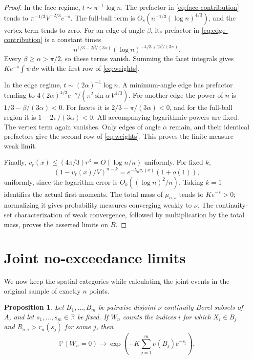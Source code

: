 \documentclass[11pt]{article}
\newtheorem{proposition}[theorem]{Proposition}
\newcommand{\PP}{\mathbb P}
\begin{document}
\begin{proof}
In the face regime, $t\sim\pi^{-1}\log n$. The prefactor in
\eqref{eq:face-contribution} tends to $\pi^{-1/3}V^{-2/3}e^{-s}$.
The full-ball term is $O_s(n^{-1/3}(\log n)^{4/3})$, and the vertex term
tends to zero. For an edge of angle $\beta$, its prefactor in
\eqref{eq:edge-contribution} is a constant times
\[
 n^{1/3-2\beta/(3\pi)}(\log n)^{-4/3+2\beta/(3\pi)}.
\]
Every $\beta\geq\alpha>\pi/2$, so these terms vanish. Summing the facet
integrals gives $Ke^{-s}\int\psi\,d\nu$ with the first row of
\eqref{eq:weights}.

In the edge regime, $t\sim(2\alpha)^{-1}\log n$. A minimum-angle edge
has prefactor tending to
$4(2\alpha)^{4/3}e^{-s}/(\pi^2\sin\alpha\,V^{1/3})$.
For another edge the power of $n$ is $1/3-\beta/(3\alpha)<0$.
For facets it is $2/3-\pi/(3\alpha)<0$, and for the full-ball region it
is $1-2\pi/(3\alpha)<0$. All accompanying logarithmic powers are fixed.
The vertex term again vanishes. Only edges of angle $\alpha$ remain,
and their identical prefactors give the second row of \eqref{eq:weights}.
This proves the finite-measure weak limit.

Finally, $v_r(x)\leq(4\pi/3)r^3=O(\log n/n)$ uniformly. For fixed $k$,
\begin{equation}\label{eq:binomial-approximation}
 (1-v_r(x)/V)^{n-k}
 =e^{-\lambda_nv_r(x)}(1+o(1)),
\end{equation}
uniformly, since the logarithm error is $O_k((\log n)^2/n)$.
Taking $k=1$ identifies the actual first moments. The total mass of
$\mu_{n,s}$ tends to $Ke^{-s}>0$; normalizing it gives probability
measures converging weakly to $\nu$. The continuity-set characterization
of weak convergence, followed by multiplication by the total mass, proves
the asserted limits on $B$.
\end{proof}

\section{Joint no-exceedance limits}

We now keep the spatial categories while calculating the joint events in
the original sample of exactly $n$ points.

\begin{proposition}\label{prop:void}
Let $B_1,\ldots,B_m$ be pairwise disjoint $\nu$-continuity Borel subsets of
$A$, and let $s_1,\ldots,s_m\in\mathbb R$ be fixed. If $W_n$ counts the
indices $i$ for which $X_i\in B_j$ and $R_{n,i}>r_n(s_j)$ for some $j$, then
\begin{equation}\label{eq:void}
 \PP(W_n=0)\longrightarrow
 \exp\left(-K\sum_{j=1}^m\nu(B_j)e^{-s_j}\right).
\end{equation}
\end{proposition}
\end{document}
